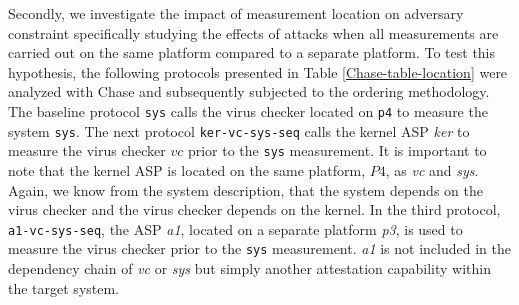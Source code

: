 \documentclass[runningheads]{llncs}
\theoremstyle{definition}
\begin{document}
Secondly, we investigate the impact of measurement location on adversary constraint specifically studying the effects of attacks when all measurements are carried out on the same platform compared to a separate platform. To test this hypothesis, the following protocols presented in Table \ref{Chase-table-location} were analyzed with Chase and subsequently subjected to the ordering methodology. The baseline protocol \texttt{sys} calls the virus checker located on \texttt{p4} to measure the system \texttt{sys}. The next protocol \texttt{ker-vc-sys-seq} calls the kernel ASP \emph{ker} to measure the virus checker $vc$ prior to the \texttt{sys} measurement. It is important to note that the kernel ASP is located on the same platform, $P4$, as \emph{vc} and \emph{sys}. Again, we know from the system description, that the system depends on the virus checker and the virus checker depends on the kernel. In the third protocol, \texttt{a1-vc-sys-seq}, the ASP \emph{a1}, located on a separate platform \emph{p3}, is used to measure the virus checker prior to the \texttt{sys} measurement. \emph{a1} is not included in the dependency chain of \emph{vc} or \emph{sys} but simply another attestation capability within the target system.

\end{document}
